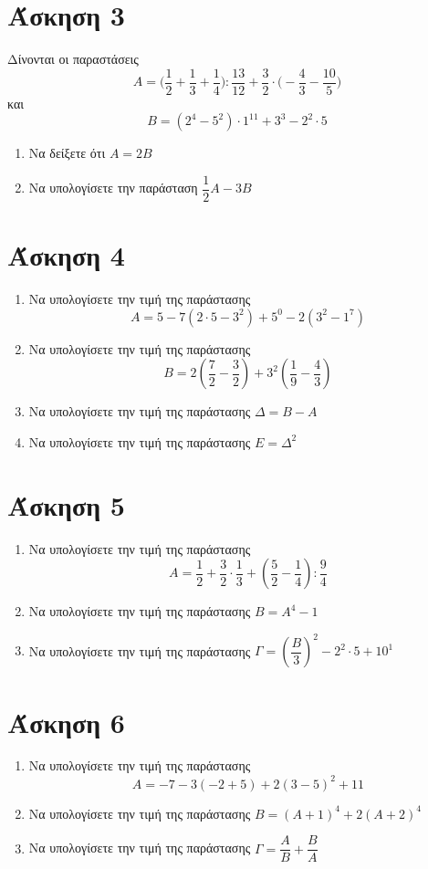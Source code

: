 \documentclass[a4paper,10pt]{report}
\begin{document}
\section*{Άσκηση 3  \hfill \small{}}
Δίνονται οι παραστάσεις 
$$ Α=\biggl( \dfrac{1}{2}+\dfrac{1}{3}+\dfrac{1}{4}  \biggr): \dfrac{13}{12}+\dfrac{3}{2}\cdot 
\biggl( -\dfrac{4}{3} -\dfrac{10}{5}  \biggr) $$
και 
$$ Β=(2^{4}-5^{2})\cdot 1^{11} +3^{3}-2^{2}\cdot 5  $$
\begin{enumerate}[1)]
 \item Να δείξετε ότι $Α=2Β$
 \item Να υπολογίσετε την παράσταση $\dfrac{1}{2}Α-3Β$
\end{enumerate}

\section*{Άσκηση 4  \hfill \small{}}
\begin{enumerate}[1)]
 \item Να υπολογίσετε την τιμή της παράστασης $$Α=5-7(2\cdot 5-3^{2})+5^{0}-2(3^{2}-1^{7})$$
 \item Να υπολογίσετε την τιμή της παράστασης $$B=2(\dfrac{7}{2}-\dfrac{3}{2})+3^{2}(\dfrac{1}{9}-\dfrac{4}{3})$$
 \item Να υπολογίσετε την τιμή της παράστασης $Δ=Β-A$
 \item Να υπολογίσετε την τιμή της παράστασης $Ε=Δ^{2}$
\end{enumerate}

\section*{Άσκηση 5  \hfill \small{}}
\begin{enumerate}[1)]
 \item Να υπολογίσετε την τιμή της παράστασης $$Α=\dfrac{1}{2}+\dfrac{3}{2}\cdot \dfrac{1}{3}+(\dfrac{5}{2}-\dfrac{1}{4}):\dfrac{9}{4}$$
 \item Να υπολογίσετε την τιμή της παράστασης $Β=A^{4}-1$
 \item Να υπολογίσετε την τιμή της παράστασης $Γ=(\dfrac{Β}{3})^{2}-2^{2}\cdot 5+10^{1}$
\end{enumerate}

\section*{Άσκηση 6  \hfill \small{}}
\begin{enumerate}[1)]
 \item Να υπολογίσετε την τιμή της παράστασης $$Α=-7-3(-2+5)+2(3-5)^{2}+11$$
 \item Να υπολογίσετε την τιμή της παράστασης $Β=(A+1)^{4}+2(A+2)^{4}$
 \item Να υπολογίσετε την τιμή της παράστασης $Γ=\dfrac{A}{Β}+\dfrac{Β}{Α}$
\end{enumerate}






\end{document}

